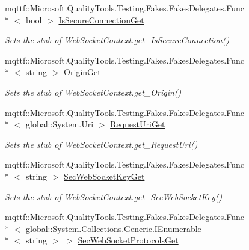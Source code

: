 \begin{DoxyCompactItemize}
mqttf\-::\-Microsoft.\-Quality\-Tools.\-Testing.\-Fakes.\-Fakes\-Delegates.\-Func\\*
$<$ bool $>$ \hyperlink{class_system_1_1_net_1_1_web_sockets_1_1_fakes_1_1_stub_web_socket_context_a46621c8ba9b84934837a188d6ab8aacd}{Is\-Secure\-Connection\-Get}
\begin{DoxyCompactList}\small\item\em Sets the stub of Web\-Socket\-Context.\-get\-\_\-\-Is\-Secure\-Connection()\end{DoxyCompactList}\item 
mqttf\-::\-Microsoft.\-Quality\-Tools.\-Testing.\-Fakes.\-Fakes\-Delegates.\-Func\\*
$<$ string $>$ \hyperlink{class_system_1_1_net_1_1_web_sockets_1_1_fakes_1_1_stub_web_socket_context_a29b0e79eb4919f2f9d95970ecf72667a}{Origin\-Get}
\begin{DoxyCompactList}\small\item\em Sets the stub of Web\-Socket\-Context.\-get\-\_\-\-Origin()\end{DoxyCompactList}\item 
mqttf\-::\-Microsoft.\-Quality\-Tools.\-Testing.\-Fakes.\-Fakes\-Delegates.\-Func\\*
$<$ global\-::\-System.\-Uri $>$ \hyperlink{class_system_1_1_net_1_1_web_sockets_1_1_fakes_1_1_stub_web_socket_context_a17fd2302a414d813a7e1d298bfdffe8e}{Request\-Uri\-Get}
\begin{DoxyCompactList}\small\item\em Sets the stub of Web\-Socket\-Context.\-get\-\_\-\-Request\-Uri()\end{DoxyCompactList}\item 
mqttf\-::\-Microsoft.\-Quality\-Tools.\-Testing.\-Fakes.\-Fakes\-Delegates.\-Func\\*
$<$ string $>$ \hyperlink{class_system_1_1_net_1_1_web_sockets_1_1_fakes_1_1_stub_web_socket_context_a81f361205c84607b3b25b395b20436ac}{Sec\-Web\-Socket\-Key\-Get}
\begin{DoxyCompactList}\small\item\em Sets the stub of Web\-Socket\-Context.\-get\-\_\-\-Sec\-Web\-Socket\-Key()\end{DoxyCompactList}\item 
mqttf\-::\-Microsoft.\-Quality\-Tools.\-Testing.\-Fakes.\-Fakes\-Delegates.\-Func\\*
$<$ global\-::\-System.\-Collections.\-Generic.\-I\-Enumerable\\*
$<$ string $>$ $>$ \hyperlink{class_system_1_1_net_1_1_web_sockets_1_1_fakes_1_1_stub_web_socket_context_a1bd4d812af052e0df80d2ea73e6629f4}{Sec\-Web\-Socket\-Protocols\-Get}

\end{DoxyCompactItemize}
